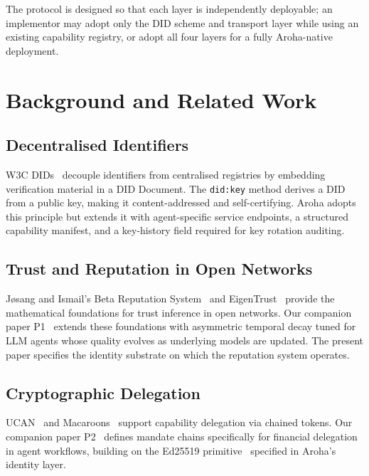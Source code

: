 \documentclass[conference]{IEEEtran}
\begin{document}
The protocol is designed so that each layer is independently
deployable; an implementor may adopt only the DID scheme and
transport layer while using an existing capability registry, or
adopt all four layers for a fully Aroha-native deployment.

\section{Background and Related Work}
\label{sec:background}

\subsection{Decentralised Identifiers}

W3C DIDs~\cite{w3c2022did} decouple identifiers from
centralised registries by embedding verification material in a
DID Document. The \texttt{did:key} method derives a DID from a
public key, making it content-addressed and self-certifying.
Aroha adopts this principle but extends it with agent-specific
service endpoints, a structured capability manifest, and a
key-history field required for key rotation auditing.

\subsection{Trust and Reputation in Open Networks}

J\o{}sang and Ismail's Beta Reputation System~\cite{josang2002beta}
and EigenTrust~\cite{kamvar2003eigentrust} provide the
mathematical foundations for trust inference in open networks.
Our companion paper P1~\cite{aroha2025p1} extends these
foundations with asymmetric temporal decay tuned for LLM agents
whose quality evolves as underlying models are updated. The
present paper specifies the identity substrate on which the
reputation system operates.

\subsection{Cryptographic Delegation}

UCAN~\cite{fission2022ucan} and Macaroons~\cite{birgisson2014macaroons}
support capability delegation via chained tokens. Our companion
paper P2~\cite{aroha2025p2} defines mandate chains specifically
for financial delegation in agent workflows, building on the
Ed25519 primitive~\cite{bernstein2011ed25519,josefsson2017ed25519rfc}
specified in Aroha's identity layer.
\end{document}
